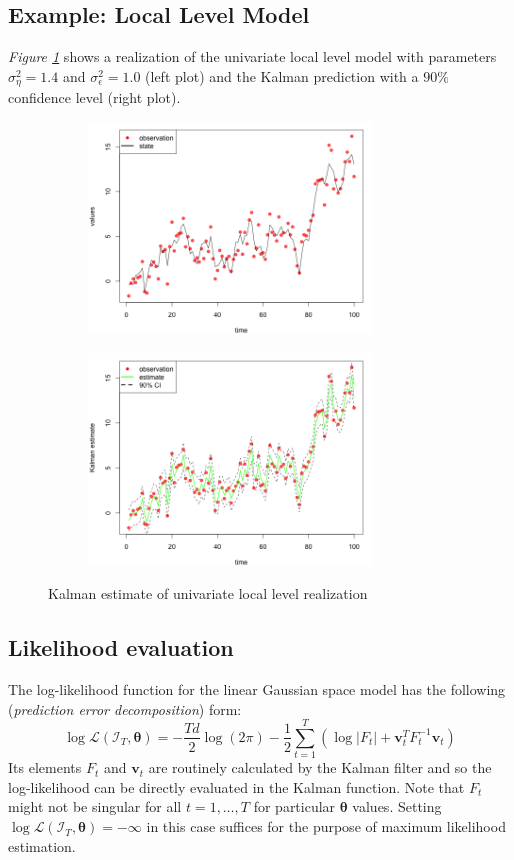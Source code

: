 \documentclass[11pt, oneside]{scrreprt}   	%
\begin{document}
\subsection{Example: Local Level Model}
\textit{Figure \ref{fig:ullm-kalman}} shows a realization of the univariate local level model with parameters $\sigma_{\eta}^2=1.4$ and $\sigma_{\epsilon}^2=1.0$ (left plot) and the Kalman prediction with a $90\%$ confidence level (right plot).
\begin{figure}[h!]
\centering
\begin{subfigure}{.5\textwidth}
  \centering
  \includegraphics[width=75mm]{../../images/ullm-realization.png}
\end{subfigure}%
\begin{subfigure}{.5\textwidth}
  \centering
  \includegraphics[width=75mm]{../../images/ullm-estimate-kalman.png}
\end{subfigure}
\caption{Kalman estimate of univariate local level realization}
\label{fig:ullm-kalman}
\end{figure}

\subsection{Likelihood evaluation}
The log-likelihood function for the linear Gaussian space model has the following (\textit{prediction error decomposition}) form:
$$
\log \mathcal{L}(\mathcal{I}_T, \boldsymbol{\theta}) = -\frac{Td}{2} \log(2 \pi) - \frac{1}{2} \sum_{t=1}^T (\log |F_t| + \boldsymbol{v}_t^TF_t^{-1} \boldsymbol{v}_t)
$$
Its elements $F_t$ and $\boldsymbol{v}_t$ are routinely calculated by the Kalman filter and so the log-likelihood can be directly evaluated in the Kalman function. Note that $F_t$ might not be singular for all $t=1,\ldots, T$ for particular $\boldsymbol{\theta}$ values. Setting $\log \mathcal{L}(\mathcal{I}_T, \boldsymbol{\theta}) = -\infty$ in this case suffices for the purpose of maximum likelihood estimation.
\end{document}
